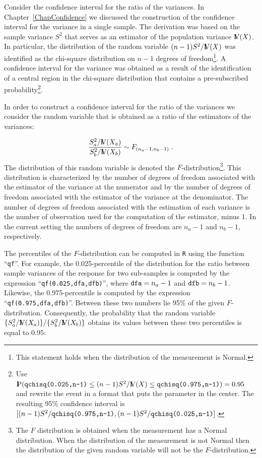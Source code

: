 \documentclass[]{krantz}
\newcommand{\Prob}{{\rm I\kern-.3em P}}
\newcommand{\Var}{{\rm I\kern-.3em V}}
\theoremstyle{definition}
\theoremstyle{definition}
\theoremstyle{definition}
\theoremstyle{remark}
\begin{document}
Consider the confidence interval for the ratio of the variances. In
Chapter~\ref{ChapConfidence} we discussed the construction of the
confidence interval for the variance in a single sample. The derivation
was based on the sample variance \(S^2\) that serves as an estimator of
the population variance \(\Var(X)\). In particular, the distribution of
the random variable \((n-1)S^2/\Var(X)\) was identified as the
chi-square distribution on \(n-1\) degrees of freedom\footnote{This
  statement holds when the distribution of the measurement is Normal.}.
A confidence interval for the variance was obtained as a result of the
identification of a central region in the chi-square distribution that
contains a pre-subscribed probability\footnote{Use
  \(\Prob(\mbox{\texttt{qchisq(0.025,n-1)}} \leq (n-1)S^2/\Var(X) \leq \mbox{\texttt{qchisq(0.975,n-1)}}) = 0.95\)
  and rewrite the event in a format that puts the parameter in the
  center. The resulting 95\% confidence interval is
  \([(n-1)S^2/\mbox{\texttt{qchisq(0.975,n-1)}},(n-1)S^2/\mbox{\texttt{qchisq(0.025,n-1)}}]\).}.

In order to construct a confidence interval for the ratio of the
variances we consider the random variable that is obtained as a ratio of
the estimators of the variances:

\[\frac{S_a^2/\Var(X_a)}{S^2_b/\Var(X_b)} \sim F_{(n_a-1,n_b-1)}\;.\]
The distribution of this random variable is denoted the
\(F\)-distribution\footnote{The \(F\) distribution is obtained when the
  measurement has a Normal distribution. When the distribution of the
  measurement is not Normal then the distribution of the given random
  variable will not be the \(F\)-distribution.}. This distribution is
characterized by the number of degrees of freedom associated with the
estimator of the variance at the numerator and by the number of degrees
of freedom associated with the estimator of the variance at the
denominator. The number of degrees of freedom associated with the
estimation of each variance is the number of observation used for the
computation of the estimator, minus 1. In the current setting the
numbers of degrees of freedom are \(n_a-1\) and \(n_b-1\), respectively.

The percentiles of the \(F\)-distribution can be computed in \texttt{R}
using the function ``\texttt{qf}''. For example, the 0.025-percentile of
the distribution for the ratio between sample variances of the response
for two sub-samples is computed by the expression
``\texttt{qf(0.025,dfa,dfb)}'', where \(\mbox{\texttt{dfa}} = n_a - 1\)
and \(\mbox{\texttt{dfb}} = n_b - 1\). Likewise, the 0.975-percentile is
computed by the expression ``\texttt{qf(0.975,dfa,dfb)}''. Between these
two numbers lie 95\% of the given \(F\)-distribution. Consequently, the
probability that the random variable
\(\{S_a^2/\Var(X_a)\}/\{S_b^2/\Var(X_b)\}\) obtains its values between
these two percentiles is equal to 0.95:
\end{document}
